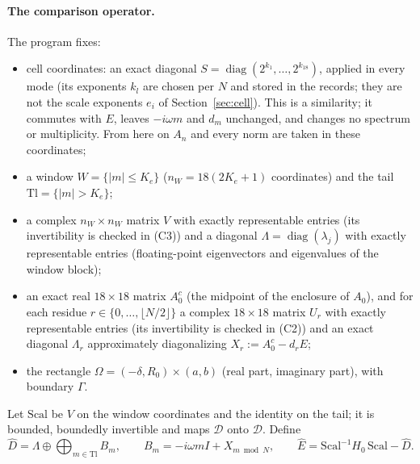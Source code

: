 \documentclass[11pt]{article}
\theoremstyle{definition}
\newcommand{\Dsp}{\mathcal{D}}
\begin{document}
\paragraph{The comparison operator.} The program fixes:
\begin{itemize}
\item cell coordinates: an exact diagonal $S = \operatorname{diag}(2^{k_1}, \dots, 2^{k_{18}})$, applied in every mode (its exponents $k_l$ are chosen per $N$ and stored in the records; they are not the scale exponents $e_i$ of Section~\ref{sec:cell}). This is a similarity; it commutes with $E$, leaves $-i\omega m$ and $d_m$ unchanged, and changes no spectrum or multiplicity. From here on $A_n$ and every norm are taken in these coordinates;
\item a window $W = \{|m| \le K_e\}$ ($n_W = 18(2K_e + 1)$ coordinates) and the tail $\mathrm{Tl} = \{|m| > K_e\}$;
\item a complex $n_W \times n_W$ matrix $V$ with exactly representable entries (its invertibility is checked in (C3)) and a diagonal $\Lambda = \operatorname{diag}(\lambda_j)$ with exactly representable entries (floating-point eigenvectors and eigenvalues of the window block);
\item an exact real $18 \times 18$ matrix $A_0^c$ (the midpoint of the enclosure of $A_0$), and for each residue $r \in \{0, \dots, \lfloor N/2\rfloor\}$ a complex $18 \times 18$ matrix $U_r$ with exactly representable entries (its invertibility is checked in (C2)) and an exact diagonal $\Lambda_r$ approximately diagonalizing $X_r := A_0^c - d_rE$;
\item the rectangle $\Omega = (-\delta, R_0) \times (a, b)$ (real part, imaginary part), with boundary $\Gamma$.
\end{itemize}
Let $\mathrm{Scal}$ be $V$ on the window coordinates and the identity on the tail; it is bounded, boundedly invertible and maps $\Dsp$ onto $\Dsp$. Define
\[ \hat D = \Lambda \oplus \bigoplus_{m\in\mathrm{Tl}}B_m, \qquad B_m = -i\omega mI + X_{m \bmod N}, \qquad \hat E = \mathrm{Scal}^{-1}H_0\,\mathrm{Scal} - \hat D. \]
\end{document}
